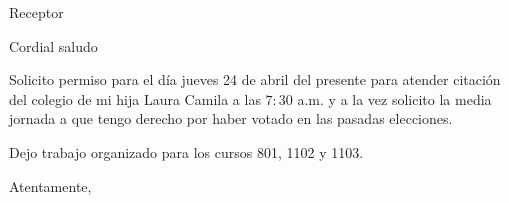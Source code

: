 \documentclass[letterpaper,spanish,11pt]{letter}
\begin{document}
\begin{letter}{Receptor}
	
\opening{Cordial saludo}
Solicito permiso para el día jueves 24 de abril del presente para atender citación del colegio de mi hija Laura Camila a las $7:30$ a.m. y a la vez solicito la media jornada a que tengo derecho por haber votado en las pasadas elecciones.

Dejo trabajo organizado para los cursos 801, 1102 y 1103.
\closing{Atentamente,}


\end{letter}
\end{document}
